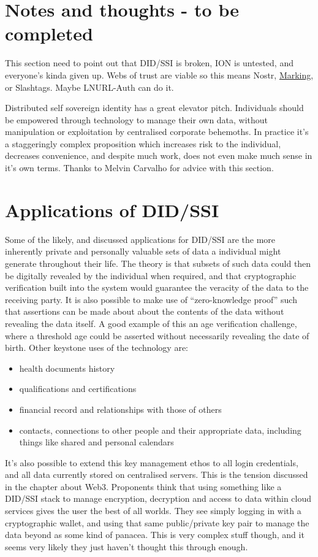\section{Notes and thoughts - to be completed}
This section need to point out that DID/SSI is broken, ION is untested, and everyone's kinda given up. Webs of trust are viable so this means Nostr, \href{https://github.com/project-bitmark/marking/wiki#marking}{Marking}, or Slashtags. Maybe LNURL-Auth can do it.\par
Distributed self sovereign identity has a great elevator pitch. Individuals should be empowered through technology to manage their own data, without manipulation or exploitation by centralised corporate behemoths. In practice it's a staggeringly complex proposition which increases risk to the individual, decreases convenience, and despite much work, does not even make much sense in it's own terms. Thanks to Melvin Carvalho for advice with this section.
\section{Applications of DID/SSI}
Some of the likely, and discussed applications for DID/SSI are the more inherently private and personally valuable sets of data a individual might generate throughout their life. The theory is that subsets of such data could then be digitally revealed by the individual when required, and that cryptographic verification built into the system would guarantee the veracity of the data to the receiving party. It is also possible to make use of ``zero-knowledge proof'' such that assertions can be made about about the contents of the data without revealing the data itself. A good example of this an age verification challenge, where a threshold age could be asserted without necessarily revealing the date of birth. 
Other keystone uses of the technology are:
\begin{itemize}
\item health documents history
\item qualifications and certifications
\item financial record and relationships with those of others
\item contacts, connections to other people and their appropriate data, including things like shared and personal calendars
\end{itemize}  
It's also possible to extend this key management ethos to all login credentials, and all data currently stored on centralised servers. This is the tension discussed in the chapter about Web3. Proponents think that using something like a DID/SSI stack to manage encryption, decryption and access to data within cloud services gives the user the best of all worlds. They see simply logging in with a cryptographic wallet, and using that same public/private key pair to manage the data beyond as some kind of panacea. This is very complex stuff though, and it seems very likely they just haven't thought this through enough.
